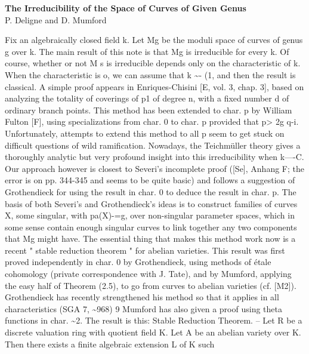 \documentclass[11pt]{article}
\theoremstyle{plain}
\theoremstyle{definition}
\theoremstyle{remark}
\begin{document}
\begin{center}
{\Large\bfseries The Irreducibility of the Space of Curves of Given Genus}\\[0.6em]
{\large P. Deligne and D. Mumford}
\end{center}
\vspace{0.7em}

Fix an algebraically closed field k. Let Mg be the moduli space of curves of genus g over k. The main result of this note is that Mg is irreducible for every k. Of course, whether or not M s is irreducible depends only on the characteristic of k. When the characteristic is o, we can assume that k \textasciitilde{}- (1, and then the result is classical. A simple proof appears in Enriques-Chisini [E, vol. 3, chap. 3], based on analyzing the totality of coverings of p1 of degree n, with a fixed number d of ordinary branch points. This method has been extended to char. p by William Fulton [F], using specializations from char. 0 to char. p provided that p> 2g q-i. Unfortunately, attempts to extend this method to all p seem to get stuck on difficult questions of wild ramification. Nowadays, the Teichmüller theory gives a thoroughly analytic but very profound insight into this irreducibility when k----C. Our approach however is closest to Severi's incomplete proof ([Se], Anhang F; the error is on pp. 344-345 and seems to be quite basic) and follows a suggestion of Grothendieck for using the result in char. 0 to deduce the result in char. p. The basis of both Severi's and Grothendieck's ideas is to construct families of curves X, some singular, with pa(X)-=g, over non-singular parameter spaces, which in some sense contain enough singular curves to link together any two components that Mg might have. The essential thing that makes this method work now is a recent " stable reduction theorem " for abelian varieties. This result was first proved independently in char. 0 by Grothendieck, using methods of étale cohomology (private correspondence with J. Tate), and by Mumford, applying the easy half of Theorem (2.5), to go from curves to abelian varieties (cf. [M2]). Grothendieck has recently strengthened his method so that it applies in all characteristics (SGA 7, \textasciitilde{}968) 9 Mumford has also given a proof using theta functions in char. \textasciitilde{}2. The result is this: Stable Reduction Theorem. -- Let R be a discrete valuation ring with quotient field K. Let A be an abelian variety over K. Then there exists a finite algebraic extension L of K such
\end{document}
